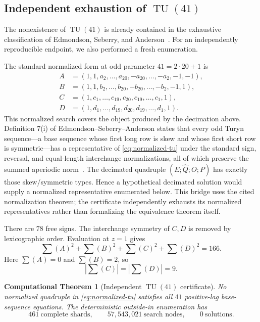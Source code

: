 \documentclass[11pt]{article}
\newtheorem{computationaltheorem}[theorem]{Computational Theorem}
\theoremstyle{remark}
\newcommand{\TU}{\operatorname{TU}}
\begin{document}
\subsection{Independent exhaustion of \texorpdfstring{$\TU(41)$}{TU(41)}}

The nonexistence of $\TU(41)$ is already contained in the exhaustive
classification of Edmondson, Seberry, and Anderson~\cite{edmondson}.
For an independently reproducible endpoint, we also performed a fresh
enumeration.

The standard normalized form at odd parameter $41=2\cdot20+1$ is
\begin{equation}
\label{eq:normalized-tu}
\begin{aligned}
 A&=(1,1,a_2,\ldots,a_{20},-a_{20},\ldots,-a_2,-1,-1),\\
 B&=(1,1,b_2,\ldots,b_{20},-b_{20},\ldots,-b_2,-1, 1),\\
 C&=(1,c_1,\ldots,c_{19},c_{20},c_{19},\ldots,c_1,1),\\
 D&=(1,d_1,\ldots,d_{19},d_{20},d_{19},\ldots,d_1,1).
\end{aligned}
\end{equation}
This normalized search covers the object produced by the decimation above.
Definition 7(i) of Edmondson--Seberry--Anderson states that every odd
Turyn sequence---a base sequence whose first long row is skew and whose
first short row is symmetric---has a representative of
\eqref{eq:normalized-tu} under the standard sign, reversal, and
equal-length interchange normalizations, all of which preserve the summed
aperiodic norm~\cite{edmondson}.  The decimated quadruple
$(E;\widehat Q;O;P)$ has exactly those skew/symmetric types.  Hence a
hypothetical decimated solution would supply a normalized representative
enumerated below.  This bridge uses the cited normalization theorem; the
certificate independently exhausts its normalized representatives rather
than formalizing the equivalence theorem itself.

There are $78$ free signs.  The interchange symmetry of $C,D$ is removed
by lexicographic order.  Evaluation at $z=1$ gives
\[
 \sum(A)^2+\sum(B)^2+\sum(C)^2+\sum(D)^2=166.
\]
Here $\sum(A)=0$ and $\sum(B)=2$, so
\[
 |\sum(C)|=|\sum(D)|=9.
\]

\begin{computationaltheorem}[Independent $\TU(41)$ certificate]
\label{thm:tu41}
No normalized quadruple in \eqref{eq:normalized-tu} satisfies all $41$ positive-lag
base-sequence equations.  The deterministic outside-in enumeration has
\[
 461\ \text{complete shards},\qquad
 57{,}543{,}021\ \text{search nodes},\qquad
 0\ \text{solutions}.
\]
\end{computationaltheorem}
\end{document}
